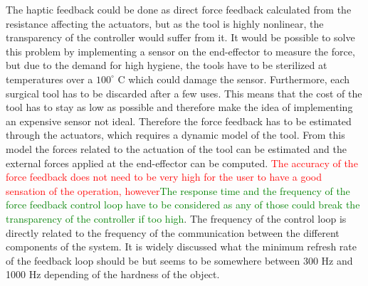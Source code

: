 The haptic feedback could be done as direct force feedback calculated from the resistance affecting the actuators, but as the tool is highly nonlinear, the transparency of the controller would suffer from it. It would be possible to solve this problem by implementing a sensor on the end-effector to measure the force, but due to the demand for high hygiene, the tools have to be sterilized at temperatures over a $100^\circ$ C which could damage the sensor. Furthermore, each surgical tool has to be discarded after a few uses\cite{catalog_davinci}. This means that the cost of the tool has to stay as low as possible and therefore make the idea of implementing an expensive sensor not ideal. Therefore the force feedback has to be estimated through the actuators, which requires a dynamic model of the tool. From this model the forces related to the actuation of the tool can be estimated and the external forces applied at the end-effector can be computed. \textcolor{red}{The accuracy of the force feedback does not need to be very high for the user to have a good sensation of the operation, however}\textcolor{green}{The response time and the frequency of the force feedback control loop have to be considered as any of those could break the transparency of the controller if too high}. The frequency of the control loop is directly related to the frequency of the communication between the different components of the system. It is widely discussed what the minimum refresh rate of the feedback loop should be but seems to be somewhere between 300 Hz and 1000 Hz depending of the hardness of the object\cite{coles2011role}.%


